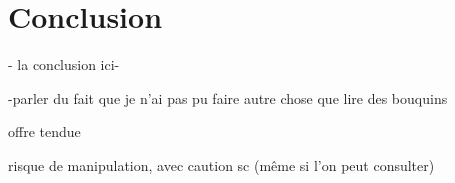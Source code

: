 
\chapter*{Conclusion}

- la conclusion ici-

-parler du fait que je n'ai pas pu faire autre chose que lire des bouquins

offre tendue

risque de manipulation, avec caution sc (même si l'on peut consulter)
